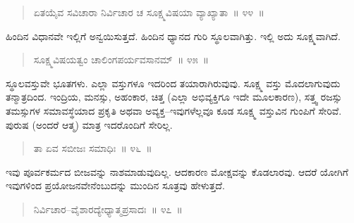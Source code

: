 \vspace{-0.3cm}

\begin{verse}
ಏತಯೈವ ಸವಿಚಾರಾ ನಿರ್ವಿಚಾರ ಚ ಸೂಕ್ಷ್ಮವಿಷಯಾ ವ್ಯಾಖ್ಯಾತಾ~॥ ೪೪~॥
\end{verse}

\vspace{-0.3cm}


ಹಿಂದಿನ ವಿಧಾನವೇ ಇಲ್ಲಿಗೆ ಅನ್ವಯಿಸುತ್ತದೆ. ಹಿಂದಿನ ಧ್ಯಾನದ ಗುರಿ ಸ್ಥೂಲವಾಗಿತ್ತು. ಇಲ್ಲಿ ಅದು ಸೂಕ್ಷ್ಮವಾಗಿದೆ. 

\vspace{-0.3cm}

\begin{verse}
ಸೂಕ್ಷ್ಮವಿಷಯತ್ವಂ ಚಾಲಿಂಗಪರ್ಯವಸಾನಮ್​~॥ ೪೫~॥
\end{verse}

\vspace{-0.3cm}


ಸ್ಥೂಲವಸ್ತುವೇ ಭೂತಗಳು. ಎಲ್ಲಾ ವಸ್ತುಗಳೂ ಇದರಿಂದ ತಯಾರಾಗಿರುವುವು. ಸೂಕ್ಷ್ಮ ವಸ್ತು ಮೊದಲಾಗುವುದು ತನ್ಮಾತ್ರದಿಂದ. ಇಂದ್ರಿಯ, ಮನಸ್ಸು, ಅಹಂಕಾರ, ಚಿತ್ತ (ಎಲ್ಲಾ ಅಭಿವ್ಯಕ್ತಿಗೂ ಇದೇ ಮೂಲಕಾರಣ), ಸತ್ತ್ವ ರಜಸ್ಸು ತಮಸ್ಸುಗಳ ಸಮಾವಸ್ಥೆಯಾದ ಪ್ರಕೃತಿ ಅಥವಾ ಅವ್ಯಕ್ತ–ಇವುಗಳೆಲ್ಲವೂ ಕೂಡ ಸೂಕ್ಷ್ಮ ವಸ್ತುವಿನ ಗುಂಪಿಗೆ ಸೇರಿವೆ. ಪುರುಷ (ಅಂದರೆ ಆತ್ಮ) ಮಾತ್ರ ಇದರೊಂದಿಗೆ ಸೇರಿಲ್ಲ.

\vspace{-0.3cm}

\begin{verse}
ತಾ ಏವ ಸಬೀಜಃ ಸಮಾಧಿಃ~॥ ೪೬~॥
\end{verse}

\vspace{-0.3cm}


ಇವು ಪೂರ್ವಕರ್ಮದ ಬೀಜವನ್ನು ನಾಶಮಾಡುವುದಿಲ್ಲ. ಆದಕಾರಣ ಮೋಕ್ಷವನ್ನು ಕೊಡಲಾರವು. ಆದರೆ ಯೋಗಿಗೆ ಇವುಗಳಿಂದ ಪ್ರಯೋಜನವೇನೆಂಬುದನ್ನು ಮುಂದಿನ ಸೂತ್ರವು ಹೇಳುತ್ತದೆ. 

\vspace{-0.3cm}

\begin{verse}
ನಿರ್ವಿಚಾರ–ವೈಶಾರದ್ಯೇಧ್ಯಾತ್ಮಪ್ರಸಾದಃ~॥ ೪೭~॥
\end{verse}

\vspace{-0.3cm}


